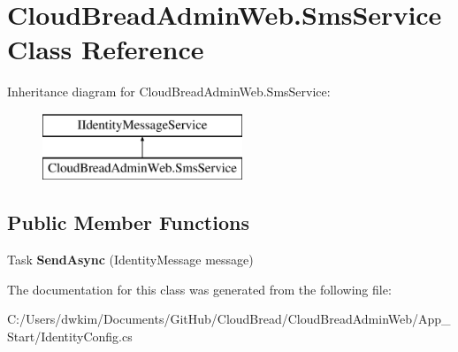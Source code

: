 \hypertarget{a00182}{}\section{Cloud\+Bread\+Admin\+Web.\+Sms\+Service Class Reference}
\label{a00182}
Inheritance diagram for Cloud\+Bread\+Admin\+Web.\+Sms\+Service\+:\begin{figure}[H]
\begin{center}
\leavevmode
\includegraphics[height=2.000000cm]{a00182}
\end{center}
\end{figure}
\subsection*{Public Member Functions}
\begin{DoxyCompactItemize}
\item 
Task {\bfseries Send\+Async} (Identity\+Message message)\hypertarget{a00182_af0f1e898dd0ecdb4647e53338f478b4b}{}\label{a00182_af0f1e898dd0ecdb4647e53338f478b4b}

\end{DoxyCompactItemize}


The documentation for this class was generated from the following file\+:\begin{DoxyCompactItemize}
\item 
C\+:/\+Users/dwkim/\+Documents/\+Git\+Hub/\+Cloud\+Bread/\+Cloud\+Bread\+Admin\+Web/\+App\+\_\+\+Start/Identity\+Config.\+cs\end{DoxyCompactItemize}
